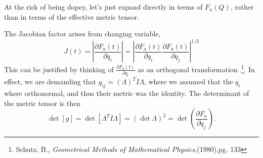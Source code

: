 At the risk of being dopey, let's just expand directly in terms of $F_a(Q)$,
rather than in terms of the effective metric tensor.    

The Jacobian factor arises from changing variable, 
\begin{equation}
J(t)=\left|\frac{\partial F_a(t)}{\partial q_i}\right| 
= \left|\frac{\partial F_a(t)}{\partial q_i}\frac{\partial F_a(t)}{\partial q_j}\right|^{1/2}
\end{equation}
This can be justified by thinking of $\frac{\partial F_a(t)}{\partial q_i}$
as an orthogonal transformation~\footnote{Schutz, B., \textit{Geometrical Methods of Mathematical Physics},(1980),pg. 133}.
  In effect, we are demanding that $g_{ij} = (\Lambda)^TI\Lambda$, 
where we assumed that the $q_i$ where orthonormal, 
and thus their metric was the identity.   
The determinant of the metric tensor is then
\begin{equation}
\det[g] = \det[ \Lambda^T I\Lambda] = (\det\Lambda)^2 = \det\left(\frac{\partial F_a}{\partial q_j}\right).
\end{equation}

